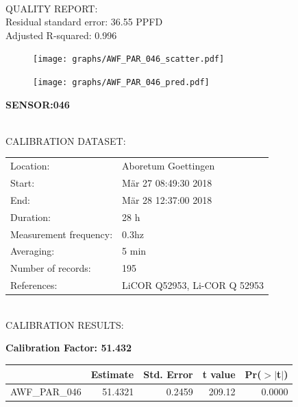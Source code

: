 \documentclass[oneside]{report}
\begin{document}
\hrulefill\\
QUALITY REPORT:\\
Residual standard error: 36.55 PPFD\\
Adjusted R-squared: 0.996



\begin{figure}[H]
  \centering
  \texttt{[image: graphs/AWF\_PAR\_046\_scatter.pdf]}
\end{figure}




\begin{figure}[H]
  \centering
  \texttt{[image: graphs/AWF\_PAR\_046\_pred.pdf]}
\end{figure}

\pagebreak


\begin{center}
\large{\textbf{SENSOR:046}}\\
\end{center}

\hrulefill\\
CALIBRATION DATASET:\\
\begin{table}[h!]
  \centering
  \label{tab:table1}
  \begin{tabular}{ll}
    Location: & Aboretum Goettingen\\ 
    
    
    Start:  & Mär 27 08:49:30 2018 \\
    End:   & Mär 28 12:37:00 2018\\ 
    Duration: & 28 h\\
    Measurement frequency: & 0.3hz\\
    Averaging:  &5 min\\
    Number of records: & 195 \\
    References: & LiCOR Q52953, Li-COR Q 52953 \\
  \end{tabular}
\end{table}

\hrulefill\\
CALIBRATION RESULTS:\\


\begin{center}
\textbf{\large{Calibration Factor: 51.432}}\\
\end{center}
\begin{table}[ht]
\centering
\begin{tabular}{rrrrr}
  \hline
 & Estimate & Std. Error & t value & Pr($>$$|$t$|$) \\ 
  \hline
AWF\_PAR\_046 & 51.4321 & 0.2459 & 209.12 & 0.0000 \\ 
   \hline
\end{tabular}
\end{table}
\end{document}
